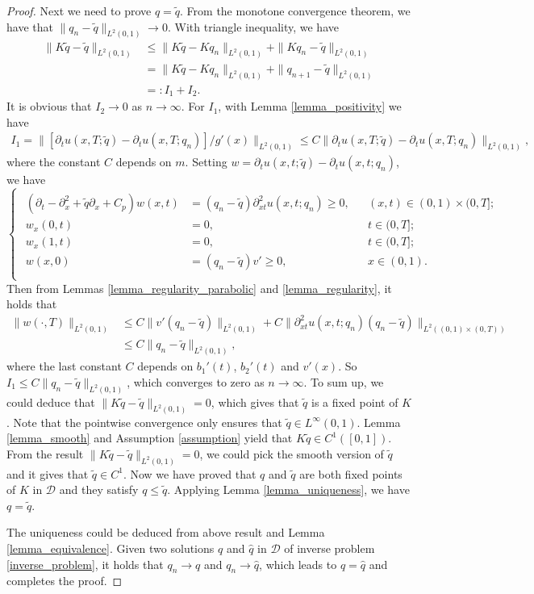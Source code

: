 \documentclass[11pt]{article}
\numberwithin{equation}{section}
\begin{document}
\begin{proof}
Next we need to prove $q=\tilde q$. From the monotone convergence theorem, we have that $\|q_n-\tilde q\|_{L^2(0,1)}\to 0$. With triangle inequality, we have 
\begin{align*}
 \|K\tilde q-\tilde q\|_{L^2(0,1)}&\le \|K\tilde q-Kq_n\|_{L^2(0,1)}+\|Kq_n-\tilde q\|_{L^2(0,1)}\\
 &=\|K\tilde q-Kq_n\|_{L^2(0,1)} +\|q_{n+1}-\tilde q\|_{L^2(0,1)}\\
 &=:I_1+I_2.
\end{align*}
It is obvious that $I_2\to 0$ as $n\to \infty$. For $I_1$, with Lemma \ref{lemma_positivity} we have 
\begin{align*}
 I_1=\|[\partial_t u(x,T;\tilde q)-\partial_t u(x,T;q_n)]/g'(x)\|_{L^2(0,1)}
 \le C \|\partial_t u(x,T;\tilde q)-\partial_t u(x,T;q_n)\|_{L^2(0,1)},
\end{align*}
where the constant $C$ depends on $m$. Setting $w=\partial_t u(x,t;\tilde q)-\partial_t u(x,t;q_n)$, we have 
\begin{equation*}
 \begin{cases}
  \begin{aligned}
   (\partial_t-\partial_x^2+\tilde q\partial_x+C_p)w(x,t)
   &=(q_n-\tilde q)\partial_{xt}^2 u(x,t;q_n)\ge0, &&(x,t)\in(0,1)\times(0,T];\\
   w_x(0,t)&=0,&&t\in(0,T];\\
   w_x(1,t)&=0,&&t\in(0,T];\\
   w(x,0)&=(q_n-\tilde q)v'\ge0,&&x\in(0,1).\\
  \end{aligned}
 \end{cases}
\end{equation*}
Then from Lemmas \ref{lemma_regularity_parabolic} and \ref{lemma_regularity}, it holds that 
\begin{align*}
 \|w(\cdot,T)\|_{L^2(0,1)}&\le C\|v'(q_n-\tilde q)\|_{L^2(0,1)}+ C\|\partial_{xt}^2 u(x,t;q_n)(q_n-\tilde q)\|_{L^2((0,1)\times(0,T))}\\
 &\le C\|q_n-\tilde q\|_{L^2(0,1)},    
\end{align*}
where the last constant $C$ depends on $b_1'(t)$, $b_2'(t)$ and $v'(x)$. So $I_1\le C\|q_n-\tilde q\|_{L^2(0,1)}$, which converges to zero as $n\to \infty$. To sum up, we could deduce that $\|K\tilde q-\tilde q\|_{L^2(0,1)}=0$, which gives that $\tilde q$ is a fixed point of $K$. Note that the pointwise convergence only ensures that $\tilde q\in L^\infty(0,1)$. Lemma \ref{lemma_smooth} and Assumption \ref{assumption} yield that $K\tilde q\in C^1([0,1])$. From the result $\|K\tilde q-\tilde q\|_{L^2(0,1)}=0$, we could pick the smooth version of $\tilde q$ and it gives that $\tilde q\in C^1$. 
Now we have proved that $q$ and $\tilde q$ are both fixed points of $K$ in $\mathcal D$ and they satisfy $q\le \tilde q$. Applying Lemma \ref{lemma_uniqueness}, we have $q=\tilde q$. 

The uniqueness could be deduced from above result and Lemma \ref{lemma_equivalence}. Given two solutions $q$ and $\hat q$ in $\mathcal D$ of inverse problem \eqref{inverse_problem}, it holds that $q_n\to q$ and $q_n\to \hat q$, which leads to $q=\hat q$ and completes the proof. 
\end{proof}
\end{document}

